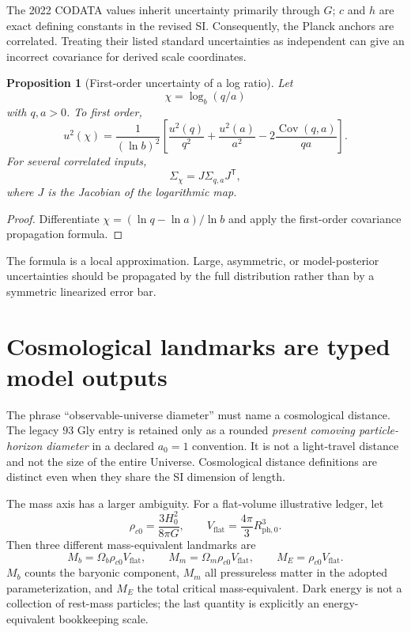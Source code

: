 \documentclass[11pt,a4paper]{article}
\theoremstyle{definition}
\theoremstyle{plain}
\newtheorem{proposition}[definition]{Proposition}
\theoremstyle{remark}
\newcommand{\Cov}{\operatorname{Cov}}
\begin{document}


The 2022 CODATA values inherit uncertainty primarily through $G$; $c$
and $h$ are exact defining constants in the revised SI. Consequently,
the Planck anchors are correlated. Treating their listed standard
uncertainties as independent can give an incorrect covariance for
derived scale coordinates.

\begin{proposition}[First-order uncertainty of a log ratio]
\label{prop:uncertainty}
Let
\[
\chi=\log_b(q/a)
\]
with $q,a>0$. To first order,
\[
u^2(\chi)
=
\frac{1}{(\ln b)^2}
\left[
\frac{u^2(q)}{q^2}
+\frac{u^2(a)}{a^2}
-2\frac{\Cov(q,a)}{qa}
\right].
\]
For several correlated inputs,
\[
\Sigma_\chi=J\Sigma_{q,a}J^\mathsf T,
\]
where $J$ is the Jacobian of the logarithmic map.
\end{proposition}

\begin{proof}
Differentiate
$\chi=(\ln q-\ln a)/\ln b$ and apply the first-order covariance
propagation formula.
\end{proof}

The formula is a local approximation. Large, asymmetric, or
model-posterior uncertainties should be propagated by the full
distribution rather than by a symmetric linearized error bar.

\section{Cosmological landmarks are typed model outputs}

The phrase ``observable-universe diameter'' must name a cosmological
distance. The legacy $93$ Gly entry is retained only as a rounded
\emph{present comoving particle-horizon diameter} in a declared
$a_0=1$ convention. It is not a light-travel distance and not the size
of the entire Universe. Cosmological distance definitions are distinct
even when they share the SI dimension of length.

The mass axis has a larger ambiguity. For a flat-volume illustrative
ledger, let
\[
\rho_{c0}=\frac{3H_0^2}{8\pi G},
\qquad
V_{\mathrm{flat}}=\frac{4\pi}{3}R_{\mathrm{ph},0}^3.
\]
Then three different mass-equivalent landmarks are
\[
M_b=\Omega_b\rho_{c0}V_{\mathrm{flat}},
\qquad
M_m=\Omega_m\rho_{c0}V_{\mathrm{flat}},
\qquad
M_E=\rho_{c0}V_{\mathrm{flat}}.
\]
$M_b$ counts the baryonic component, $M_m$ all pressureless matter in
the adopted parameterization, and $M_E$ the total critical
mass-equivalent. Dark energy is not a collection of rest-mass particles;
the last quantity is explicitly an energy-equivalent bookkeeping scale.
\end{document}
